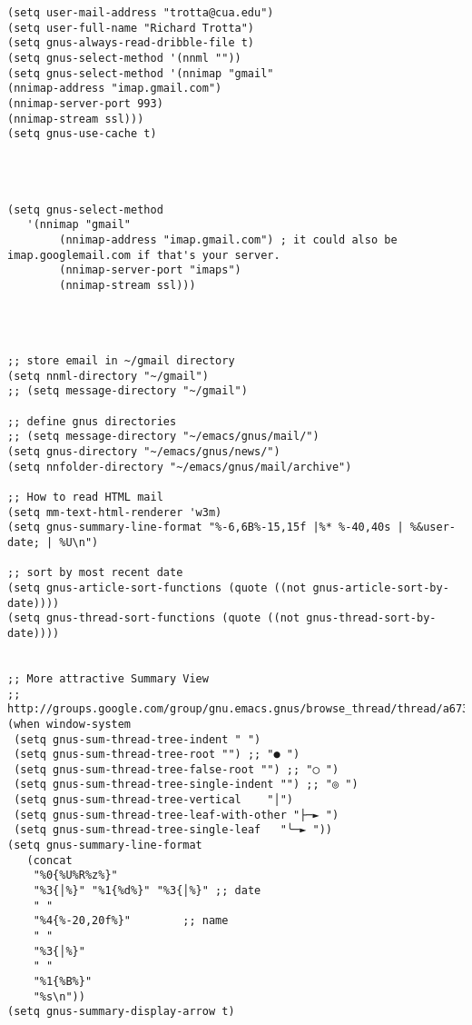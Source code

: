 \documentclass[11pt]{article}
\begin{document}
\begin{verbatim}
(setq user-mail-address "trotta@cua.edu")
(setq user-full-name "Richard Trotta")
(setq gnus-always-read-dribble-file t)
(setq gnus-select-method '(nnml ""))
(setq gnus-select-method '(nnimap "gmail"
(nnimap-address "imap.gmail.com")
(nnimap-server-port 993)
(nnimap-stream ssl)))
(setq gnus-use-cache t) 




(setq gnus-select-method
   '(nnimap "gmail"
	    (nnimap-address "imap.gmail.com") ; it could also be imap.googlemail.com if that's your server.
	    (nnimap-server-port "imaps")
	    (nnimap-stream ssl)))




;; store email in ~/gmail directory
(setq nnml-directory "~/gmail")
;; (setq message-directory "~/gmail") 

;; define gnus directories
;; (setq message-directory "~/emacs/gnus/mail/")
(setq gnus-directory "~/emacs/gnus/news/")
(setq nnfolder-directory "~/emacs/gnus/mail/archive") 

;; How to read HTML mail
(setq mm-text-html-renderer 'w3m)
(setq gnus-summary-line-format "%-6,6B%-15,15f |%* %-40,40s | %&user-date; | %U\n")

;; sort by most recent date
(setq gnus-article-sort-functions (quote ((not gnus-article-sort-by-date))))
(setq gnus-thread-sort-functions (quote ((not gnus-thread-sort-by-date))))


;; More attractive Summary View
;; http://groups.google.com/group/gnu.emacs.gnus/browse_thread/thread/a673a74356e7141f
(when window-system
 (setq gnus-sum-thread-tree-indent " ")
 (setq gnus-sum-thread-tree-root "") ;; "● ")
 (setq gnus-sum-thread-tree-false-root "") ;; "◯ ")
 (setq gnus-sum-thread-tree-single-indent "") ;; "◎ ")
 (setq gnus-sum-thread-tree-vertical    "│")
 (setq gnus-sum-thread-tree-leaf-with-other "├─► ")
 (setq gnus-sum-thread-tree-single-leaf   "╰─► "))
(setq gnus-summary-line-format
   (concat
    "%0{%U%R%z%}"
    "%3{│%}" "%1{%d%}" "%3{│%}" ;; date
    " "
    "%4{%-20,20f%}"        ;; name
    " "
    "%3{│%}"
    " "
    "%1{%B%}"
    "%s\n"))
(setq gnus-summary-display-arrow t)
\end{verbatim}
\label{sec:org22e00a0}
\end{document}
